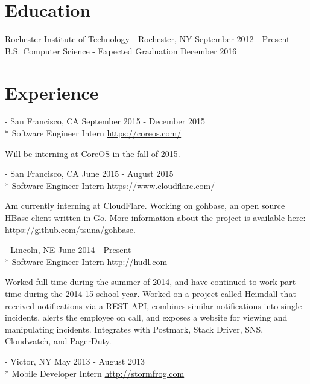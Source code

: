 \documentclass[letterpaper,margin,line,11pt]{resume}
\newcommand{\rurl}[1]{\hfill {\footnotesize \url{#1}}}
\newcommand{\rdate}[1]{\hfill {\small #1}}
\renewcommand{\employer}[5]{\item[#1] - #2 \rdate{#3} \\* #4 \rurl{#5}}
\begin{document}
\begin{resume}
\section{\mysidestyle Education}
    \begin{compactdesc}
        \item[Rochester Institute of Technology] - Rochester, NY \rdate{September 2012 - Present}
        \small
        \\B.S. Computer Science  - Expected Graduation December 2016
    \end{compactdesc}

\section{\mysidestyle Experience}
    \begin{asparadesc}
        \employer{CoreOS}{San Francisco, CA} {September 2015 - December 2015}{Software Engineer Intern}{https://coreos.com/}

        \small
        Will be interning at CoreOS in the fall of 2015.
        \normalsize
        \\

        \employer{CloudFlare}{San Francisco, CA} {June 2015 - August 2015}{Software Engineer Intern}{https://www.cloudflare.com/}

        \small
        Am currently interning at CloudFlare. Working on gohbase, an open source HBase client written in Go. More information about the project is available here: \url{https://github.com/tsuna/gohbase}.
        \normalsize
        \\

        \employer{Hudl}{Lincoln, NE}{June 2014 - Present}{Software Engineer Intern}{http://hudl.com}

        \small
        Worked full time during the summer of 2014, and have continued to work part time during the 2014-15 school year. Worked on a project called Heimdall that received notifications via a REST API, combines similar notifications into single incidents, alerts the employee on call, and exposes a website for viewing and manipulating incidents. Integrates with Postmark, Stack Driver, SNS, Cloudwatch, and PagerDuty.
        \normalsize
        \\
        \employer{Stormfrog}{Victor, NY}{May 2013 - August 2013}{Mobile Developer Intern}{http://stormfrog.com}


\end{asparadesc}
\end{resume}
\end{document}
